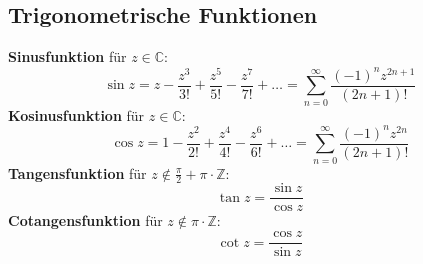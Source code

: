 \documentclass[landscape, 10pt]{article}
\newcommand{\C}{\mathbb{C}}
\newcommand{\Z}{\mathbb{Z}}
\begin{document}
\begin{multicols}{3}
       \subsection{Trigonometrische Funktionen}
              \textbf{Sinusfunktion} für 
              \textcolor{NavyBlue}{$z\in\C$}:
              \begin{equation*}
                     \sin z=z-\frac{z^3}{3!}+\frac{z^5}{5!}
              -\frac{z^7}{7!}+\dots
              =\sum_{n=0}^\infty
              \frac{(-1)^nz^{2n+1}}{(2n+1)!}
              \end{equation*}
              \textbf{Kosinusfunktion} für 
              \textcolor{NavyBlue}{$z\in\C$}:
              \begin{equation*}
                     \cos z=1-\frac{z^2}{2!}+\frac{z^4}{4!}
                     -\frac{z^6}{6!}+\dots
                     =\sum_{n=0}^\infty
                     \frac{(-1)^nz^{2n}}{(2n+1)!}
              \end{equation*}
              \textbf{Tangensfunktion} für 
              \textcolor{NavyBlue}{
              $z\notin\frac{\pi}{2}+\pi\cdot\Z$}:
              \begin{equation*}
                     \tan z=\frac{\sin z}{\cos z}
              \end{equation*}
              \textbf{Cotangensfunktion} für
              \textcolor{NavyBlue}{
              $z\notin\pi\cdot\Z$}:
              \begin{equation*}
                     \cot z=\frac{\cos z}{\sin z}
              \end{equation*}

\end{multicols}
\end{document}
